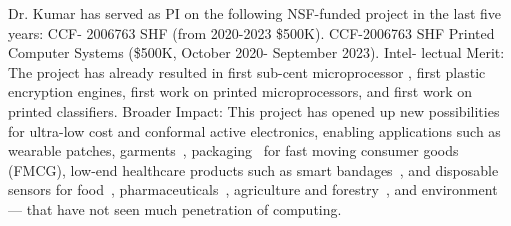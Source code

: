 Dr. Kumar has served as PI on the following NSF-funded project in the last five
years: CCF- 2006763 SHF (from 2020-2023 \$500K).  CCF-2006763 SHF Printed
Computer Systems (\$500K, October 2020- September 2023). Intel- lectual Merit:
The project has already resulted in first sub-cent microprocessor
\cite{bleier2022flexicores}, first plastic encryption
engines\cite{Bleier_2023}, first work on printed
microprocessors\cite{Bleier_2020}, and first work on printed
classifiers\cite{Mubarik_2020}. Broader Impact: This project has opened up new
possibilities for ultra-low cost and conformal active electronics, enabling
applications such as wearable patches\cite{elfaramawy2018wireless},
garments~\cite{rinaldi2018wearable}, packaging~\cite{gethin2013printed} for
fast moving consumer goods (FMCG), low-end healthcare products such as smart
bandages~\cite{derakhshandeh2018smart}, and disposable sensors for
food~\cite{chen2017disposable}, pharmaceuticals~\cite{bergamini2005disposable},
agriculture and forestry~\cite{syrovy2020fully}, and
environment~\cite{marrazza1999disposable} — that have not seen much penetration
of computing.
